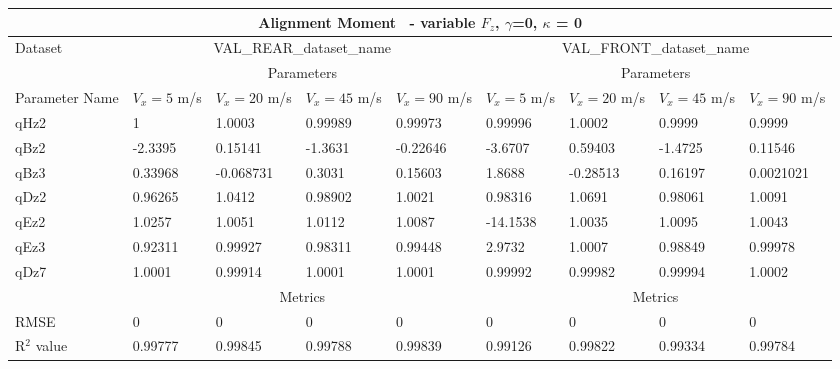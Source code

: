         \begin{tabular}{lllll|llll} \hline \multicolumn{9}{c}{Alignment Moment~ - variable $F_z$, $\gamma$=0, $\kappa$ = 0}                                                                                                                                                                        \\ \hline Dataset                         & \multicolumn{4}{c|}{VAL\_REAR\_dataset\_name}                                                & \multicolumn{4}{c}{VAL\_FRONT\_dataset\_name}                                                     \\ \hline \multicolumn{1}{c}{}            & \multicolumn{4}{c|}{Parameters}                                                              & \multicolumn{4}{c}{Parameters}                                                                    \\ \hline Parameter Name                  & $V_x = 5$ m/s     & $V_x = 20$ m/s     & $V_x = 45$ m/s     & $V_x = 90$ m/s     & $V_x = 5$ m/s      & $V_x = 20$ m/s      & $V_x = 45$ m/s      & $V_x = 90$ m/s       \\ qHz2                            & 1 & 1.0003 & 0.99989 & 0.99973 & 0.99996 & 1.0002 & 0.9999 & 0.9999  \\ qBz2                            & -2.3395 & 0.15141 & -1.3631 & -0.22646 & -3.6707 & 0.59403 & -1.4725 & 0.11546  \\ qBz3                            & 0.33968 & -0.068731 & 0.3031 & 0.15603 & 1.8688 & -0.28513 & 0.16197 & 0.0021021  \\ qDz2                            & 0.96265 & 1.0412 & 0.98902 & 1.0021 & 0.98316 & 1.0691 & 0.98061 & 1.0091  \\ qEz2                            & 1.0257 & 1.0051 & 1.0112 & 1.0087 & -14.1538 & 1.0035 & 1.0095 & 1.0043  \\ qEz3                            & 0.92311 & 0.99927 & 0.98311 & 0.99448 & 2.9732 & 1.0007 & 0.98849 & 0.99978  \\ qDz7                            & 1.0001 & 0.99914 & 1.0001 & 1.0001 & 0.99992 & 0.99982 & 0.99994 & 1.0002  \\ \hline \multicolumn{1}{c|}{}           & \multicolumn{4}{c|}{Metrics}                                                                 & \multicolumn{4}{c}{Metrics}                                                                       \\ \hline RMSE                            & 0 & 0 & 0 & 0 & 0 & 0 & 0 & 0  \\ R$^2$ value                       & 0.99777   & 0.99845   & 0.99788   & 0.99839   & 0.99126   & 0.99822   & 0.99334   & 0.99784    \\ \hline \end{tabular} 